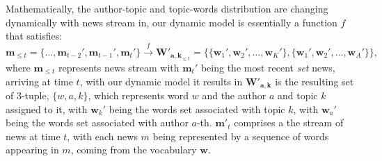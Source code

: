 Mathematically, the author-topic and topic-words distribution are changing dynamically with news stream in, our dynamic model is essentially a function $f$ that satisfies:
\begin{equation}
\label{eq:task}
\mathbf{m}_{\le t}=\{\ldots, \mathbf{m}_{t-2}', \mathbf{m}_{t-1}', \mathbf{m}_t'\}
\stackrel{f}{\longrightarrow} \boldsymbol W'_{\boldsymbol a,\boldsymbol k}_{\le t}=\{\{\mathbf{w}_1', \mathbf{w}_2', \ldots, \mathbf{w}_K'\},\{\mathbf{w}_1', \mathbf{w}_2', \ldots, \mathbf{w}_A'\}\},
\end{equation}
where $\mathbf{m}_{\le t}$ represents news stream with $\mathbf{m}_t'$ being the most recent \textit{set} news, arriving at time $t$, with our dynamic model it results in  $\boldsymbol W'_{\boldsymbol a,\boldsymbol k}$ is the resulting set of 3-tuple, $\{w,a,k\}$, which represents word $w$ and the author $a$ and topic $k$ assigned to it, with $\mathbf{w}_k'$ being the words set associated with topic $k$,  with $\mathbf{w}_a'$ being the words set associated with author $a$-th. $\mathbf{m}'_t$ comprises a the stream of news at time $t$, with each news $m$ being represented by a sequence of words appearing in $m$, coming from the vocabulary $\boldsymbol w$. %

